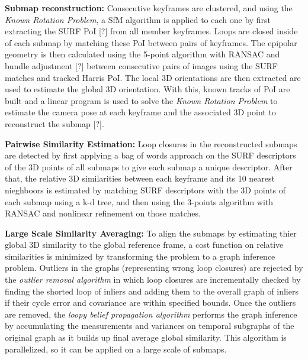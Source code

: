 \documentclass[10pt,twocolumn,letterpaper]{article}
\begin{document}
\textbf{Submap reconstruction:} Consecutive keyframes are clustered, and using the 
\textit{Known Rotation Problem}, a SfM algorithm is applied to each one by first extracting the SURF 
PoI [?] from all member keyframes. Loops are closed inside of each submap by 
matching these PoI between pairs of keyframes. The epipolar geometry is then calculated 
using the 5-point algorithm with RANSAC and bundle adjustment [?] between consecutive pairs of images 
using the SURF matches and tracked Harris PoI. The local 3D orientations are then extracted are used to 
estimate the global 3D orientation. With this, known tracks of PoI are built and 
a linear program is used to solve the \textit{Known Rotation Problem} to estimate the camera pose at each 
keyframe and the associated 3D point to reconstruct the submap [?].

\textbf{Pairwise Similarity Estimation:} Loop closures in the reconstructed submaps are 
detected by first applying a bag of words approach on the SURF descriptors of the 3D 
points of all submaps to give each submap a unique descriptor.  After that, the relative 
3D similarities between each keyframe and its 10 nearest nieghboors is estimated by 
matching SURF descriptors with the 3D points of each submap using a k-d tree, 
and then using the 3-points algorithm with RANSAC and nonlinear refinement on 
those matches.

\textbf{Large Scale Similarity Averaging:} To align the submaps by 
estimating thier 
global 3D similarity to the global reference frame, a cost function on relative 
similarities is minimized by transforming the problem to a graph inference problem.  
Outliers in the graphs (representing wrong loop closures) are rejected by the 
\textit{outlier removal algorithm} in which loop closures are incrementally checked 
by finding the shorted loop of inliers and adding them to the overall graph of inliers 
if their cycle error and covariance are within specified bounds.  
Once the outliers are removed, the \textit{loopy belief propagation algorithm} performs the 
graph inference by accumulating the measurements and variances on temporal 
subgraphs of the original graph as it builds up final average global similarity. 
This algorithm is parallelized, so it can be applied on a large scale of submaps.
\end{document}
